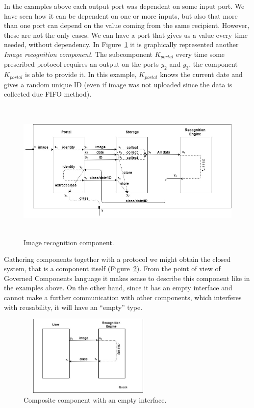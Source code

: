 In the examples above each output port was dependent on some input port. We have seen how it can be dependent on one or more inputs, but also that more than one port can depend on the value coming from the same recipient. However, these are not the only cases. We can have a port that gives us a value every time needed, without dependency. In Figure~\ref{irc2} it is graphically represented another \textit{Image recognition component}. The subcomponent  $K_{portal}$ every time some prescribed protocol requires an output on the ports $y_2$ and $y_3$, the component $K_{portal}$ is able to provide it. In this example, $K_{portal}$ knows the current date and gives a random unique ID (even if image was not uploaded since the data is collected due FIFO method).



\begin{figure}[H]

\includegraphics[width=\textwidth, height=7cm]{graph2.jpg}
\centering
\caption{Image recognition component.
\label{irc2}}

\end{figure}




Gathering components together with a protocol we might obtain the closed system, that is a component itself (Figure~\ref{user}). From the point of view of Governed Components language it makes sense to describe this component like in the examples above. On the other hand, since it has an empty interface and cannot make a further communication with other components, which interferes with reusability, it will have an ``empty'' type.


\begin{figure}[H]

\includegraphics[width=7cm, height=4cm]{user.jpg}
\centering

\caption{Composite component with an empty interface.
\label{user}}
\end{figure}




